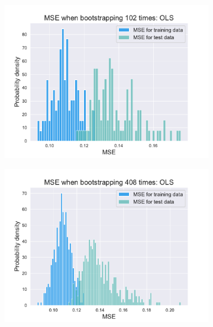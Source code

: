 \documentclass[twocolumn,english,notitlepage]{article}
\begin{document}
\begin{appendices}
\begin{figure}
\begin{subfigure}{.5\textwidth}
                \includegraphics[width=\linewidth]{BS_hist_bootstraped_102_rounds_of_degree_7.pdf}
                \caption{}
                \label{app:fig:histograms for rounds:102}
            \end{subfigure}
            \hfill
            \begin{subfigure}{.5\textwidth}
                \centering
                \includegraphics[width=\linewidth]{BS_hist_bootstraped_408_rounds_of_degree_7.pdf}
                \caption{}
                \label{app:fig:histograms for rounds:408}
            \end{subfigure}
            \begin{subfigure}{.5\textwidth}
                \centering

\end{subfigure}
\end{figure}
\end{appendices}
\end{document}

